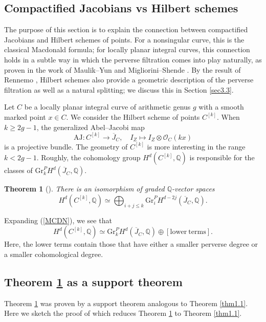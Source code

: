 \documentclass{pspum-l}
\theoremstyle{plain}
\newtheorem{thm}{Theorem}[section]
\theoremstyle{definition}
\theoremstyle{remark}
\newcommand{\BQ}{{\mathbb{Q}}}
\newcommand{\CO}{{\mathcal O}}
\begin{document}
\subsection{Compactified Jacobians vs Hilbert schemes}

The purpose of this section is to explain the connection between compactified Jacobians and Hilbert schemes of points. For a nonsingular curve, this is the classical Macdonald formula; for locally planar integral curves, this connection holds in a subtle way in which the perverse filtration comes into play naturally, as proven in the work of Maulik--Yun \cite{MY} and Migliorini--Shende \cite{MS}. By the result of Rennemo \cite{R}, Hilbert schemes also provide a geometric description of the perverse filtration as well as a natural splitting; we discuss this in Section \ref{sec3.3}.


Let $C$ be a locally planar integral curve of arithmetic genus $g$ with a smooth marked point $x \in C$. We consider the Hilbert scheme of points $C^{[k]}$. When $k \geq 2g-1$, the generalized Abel--Jacobi map 
\[
\mathrm{AJ}: C^{[k]} \to \overline{J}_C, \quad I_Z \mapsto I_Z \otimes \CO_C(kx)
\]
is a projective bundle. The geometry of $C^{[k]}$ is more interesting in the range $k < 2g-1$. Roughly, the cohomology group $H^d(C^{[k]}, \BQ)$ is responsible for the classes of $\mathrm{Gr}^P_kH^d(\overline{J}_C, \BQ)$.



\begin{thm}[\cite{MY, MS}]\label{thm3.1}
There is an isomorphism of graded $\BQ$-vector spaces
\begin{equation}\label{MCDN}
H^d(C^{[k]}, \BQ) \simeq \bigoplus_{i+j \leq k} \mathrm{Gr}_i^P H^{d-2j}(\overline{J}_C, \BQ).
\end{equation}
\end{thm}

Expanding (\ref{MCDN}), we see that
\[
H^d(C^{[k]}, \BQ) \simeq \mathrm{Gr}_k^PH^{d}(\overline{J}_C, \BQ) \oplus \mathrm{[lower~terms]}.
\]
Here, the lower terms contain those that have either a smaller perverse degree or a smaller cohomological degree. 



\subsection{Theorem \ref{thm3.1} as a support theorem}

Theorem \ref{thm3.1} was proven by a support theorem analogous to Theorem \ref{thm1.1}. Here we sketch the proof of \cite{MY} which reduces Theorem \ref{thm3.1} to Theorem \ref{thm1.1}.
\end{document}
